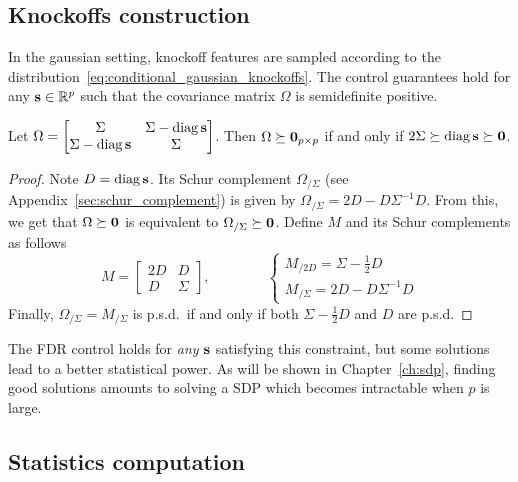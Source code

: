 \subsection{Knockoffs construction}\label{subsec:bot_sdp}

In the gaussian setting,
knockoff features are sampled according to the distribution~\ref{eq:conditional_gaussian_knockoffs}.
The control guarantees hold for any $\mathbf{s} \in \mathbb{R}^p$ such that the covariance matrix $\Omega$ is semidefinite positive.
\begin{proposition}\label{prop:omega_psd}
    Let $\Omega = \begin{bmatrix}
        \Sigma & \Sigma - \operatorname*{diag} \mathbf{s}\\
        \Sigma - \operatorname*{diag} \mathbf{s} & \Sigma
    \end{bmatrix}$.
    Then $\Omega \succeq \mathbf{0}_{p \times p}$ if and only if $2\Sigma \succeq \operatorname*{diag} \mathbf{s} \succeq \mathbf{0}$.
\end{proposition}
\begin{proof}
    Note $D = \operatorname*{diag}\mathbf{s}$.
    Its Schur complement $\Omega_{/\Sigma}$ (see Appendix~\ref{sec:schur_complement}) is given by
    $\Omega_{/\Sigma} = 2D - D\Sigma^{-1}D$.
    From this, we get that $\Omega \succeq \mathbf{0}$ is equivalent to $\Omega_{/\Sigma} \succeq \mathbf{0}$.
    Define $M$ and its Schur complements as follows
    \begin{equation*}
        M = \begin{bmatrix}
            2D & D\\
            D & \Sigma
        \end{bmatrix}
        ,\qquad\qquad
        \begin{cases*}
            M_{/2D} = \Sigma - \frac{1}{2}D\\
            M_{/\Sigma} = 2D - D\Sigma^{-1}D
        \end{cases*}
    \end{equation*}
    Finally, $\Omega_{/\Sigma} = M_{/\Sigma}$ is p.s.d.\ if and only if both $\Sigma - \frac{1}{2}D$ and $D$ are p.s.d.
\end{proof}
The FDR control holds for \emph{any} $\mathbf{s}$ satisfying this constraint,
but some solutions lead to a better statistical power.
As will be shown in Chapter~\ref{ch:sdp},
finding good solutions amounts to solving a SDP which becomes intractable when $p$ is large.

\subsection{Statistics computation}\label{subsec:bot_stats}


